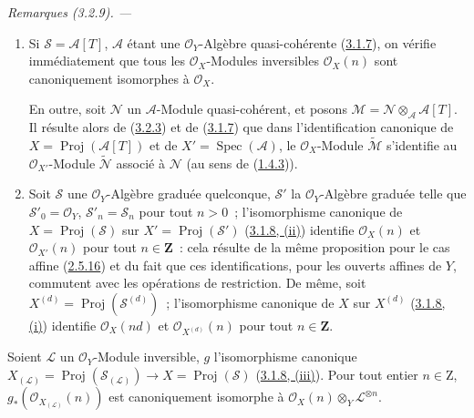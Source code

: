 \par\medskip\noindent\textit{Remarques (3.2.9). ---\ }
\label{II.3.2.9-fr}
\begin{enumerate}
  \item[\rm(i)] Si $\mathcal{S}=\mathcal{A}[T]$, $\mathcal{A}$ étant une
    $\mathcal{O}_Y$-Algèbre quasi-cohérente
    (\hyperref[II.3.1.7-fr]{3.1.7}), on vérifie immédiatement que tous les
    $\mathcal{O}_X$-Modules inversibles $\mathcal{O}_X(n)$ sont canoniquement
    isomorphes à $\mathcal{O}_X$.

    En outre, soit $\mathcal{N}$ un $\mathcal{A}$-Module quasi-cohérent, et
    posons $\mathcal{M}=\mathcal{N}\otimes_{\mathcal{A}}\mathcal{A}[T]$. Il
    résulte alors de (\hyperref[II.3.2.3-fr]{3.2.3}) et de
    (\hyperref[II.3.1.7-fr]{3.1.7}) que dans l'identification canonique de
    $X=\operatorname{Proj}(\mathcal{A}[T])$ et de
    $X'=\operatorname{Spec}(\mathcal{A})$, le $\mathcal{O}_X$-Module
    $\widetilde{\mathcal{M}}$ s'identifie au $\mathcal{O}_{X'}$-Module
    $\widetilde{\mathcal{N}}$ associé à $\mathcal{N}$ (au sens de
    (\hyperref[II.1.4.3-fr]{1.4.3})).
  \item[\rm(ii)] Soit $\mathcal{S}$ une $\mathcal{O}_Y$-Algèbre graduée
    quelconque, $\mathcal{S}'$ la $\mathcal{O}_Y$-Algèbre graduée telle que
    $\mathcal{S}'_0=\mathcal{O}_Y$, $\mathcal{S}'_n=\mathcal{S}_n$ pour tout
    $n>0$~; l'isomorphisme canonique de
    $X=\operatorname{Proj}(\mathcal{S})$ sur
    $X'=\operatorname{Proj}(\mathcal{S}')$
    (\hyperref[II.3.1.8-fr]{3.1.8, (ii)}) identifie $\mathcal{O}_X(n)$ et
    $\mathcal{O}_{X'}(n)$ pour tout $n\in\mathbf{Z}$~: cela résulte de la même
    proposition pour le cas affine (\hyperref[II.2.5.16-fr]{2.5.16}) et du
    fait que ces identifications, pour les ouverts affines de $Y$, commutent
    avec les opérations de restriction. De même, soit
    $X^{(d)}=\operatorname{Proj}(\mathcal{S}^{(d)})$~; l'isomorphisme
    canonique de $X$ sur $X^{(d)}$
    (\hyperref[II.3.1.8-fr]{3.1.8, (i)}) identifie $\mathcal{O}_X(nd)$ et
    $\mathcal{O}_{X^{(d)}}(n)$ pour tout $n\in\mathbf{Z}$.
\end{enumerate}

\begin{proposition}[3.2.10]
\label{II.3.2.10-fr}
Soient $\mathcal{L}$ un $\mathcal{O}_Y$-Module inversible, $g$ l'isomorphisme
canonique
$X_{(\mathcal{L})}=\operatorname{Proj}(\mathcal{S}_{(\mathcal{L})})
\to X=\operatorname{Proj}(\mathcal{S})$
\textup{(\hyperref[II.3.1.8-fr]{3.1.8, (iii)})}. Pour tout entier $n\in\mathrm{Z}$,
$g_*(\mathcal{O}_{X_{(\mathcal{L})}}(n))$ est canoniquement isomorphe à
$\mathcal{O}_X(n)\otimes_Y\mathcal{L}^{\otimes n}$.
\end{proposition}

